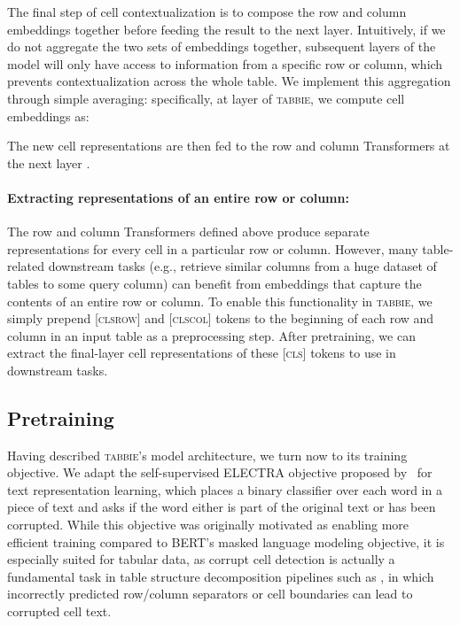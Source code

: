 \documentclass[11pt]{article}
\newcommand{\name}[0]{\textsc{tabbie}}
\begin{document}
The final step of cell contextualization is to compose the row and column embeddings together before feeding the result to the next layer. Intuitively, if we do not aggregate the two sets of embeddings together, subsequent layers of the model will only have access to information from a specific row or column, which prevents contextualization across the whole table. We implement this aggregation through simple averaging: specifically, at layer  of \name, we compute cell embeddings as:


The new cell representations  are then fed to the row and column Transformers at the next layer . 

\paragraph{Extracting representations of an entire row or column:}
The row and column Transformers defined above produce separate representations for every cell in a particular row or column. However, many table-related downstream tasks (e.g., retrieve similar columns from a huge dataset of tables to some query column) can benefit from embeddings that capture the contents of an entire row or column. To enable this functionality in \name, we simply prepend \textsc{[clsrow]} and \textsc{[clscol]} tokens to the beginning of each row and column in an input table as a preprocessing step. After pretraining, we can extract the final-layer cell representations of these  \textsc{[cls]} tokens to use in downstream tasks. 

\subsection{Pretraining}
Having described \name's model architecture, we turn now to its training objective. We adapt the self-supervised ELECTRA objective proposed by~\citet{Clark2020ELECTRA:} for text representation learning, which places a binary classifier over each word in a piece of text and asks if the word either is part of the original text or has been corrupted. While this objective was originally motivated as enabling more efficient training compared to BERT's masked language modeling objective, it is especially suited for tabular data, as corrupt cell detection is actually a fundamental task in table structure decomposition pipelines such as \cite{nishida2017understanding, tensmeyer-table, raja-table}, in which incorrectly predicted row/column separators or cell boundaries can lead to corrupted cell text.
\end{document}
